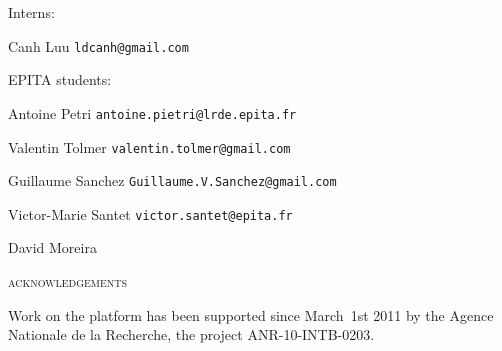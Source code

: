 \begin{titlepage}
{\bigskip
\noindent
Interns:
\medskip

\noindent
Canh Luu
\PushLine
{\tt ldcanh@gmail.com}

\bigskip
\noindent
EPITA students:
\medskip

\noindent
Antoine Petri
\PushLine
{\tt antoine.pietri@lrde.epita.fr}

\noindent
Valentin Tolmer
\PushLine
{\tt valentin.tolmer@gmail.com}

\noindent
Guillaume Sanchez
\PushLine
{\tt Guillaume.V.Sanchez@gmail.com}

\noindent
Victor-Marie Santet
\PushLine
{\tt victor.santet@epita.fr}

\noindent
David Moreira
\PushLine
{} %

\bigskip
\noindent
{}

\medskip
\noindent
{}

\medskip

\vspace*{20pt}

\begin{center}
        \textsc{acknowledgements}
    \end{center}

\noindent
Work on the \vcsn platform has been supported since March~1st 2011 by
the Agence Nationale de la Recherche,  the project
ANR-10-INTB-0203.}


\smallskip
\noindent
{}
\end{titlepage}

\titlepage
\dominitoc %
\cleardoublepage
\setcounter{page}{3} %
